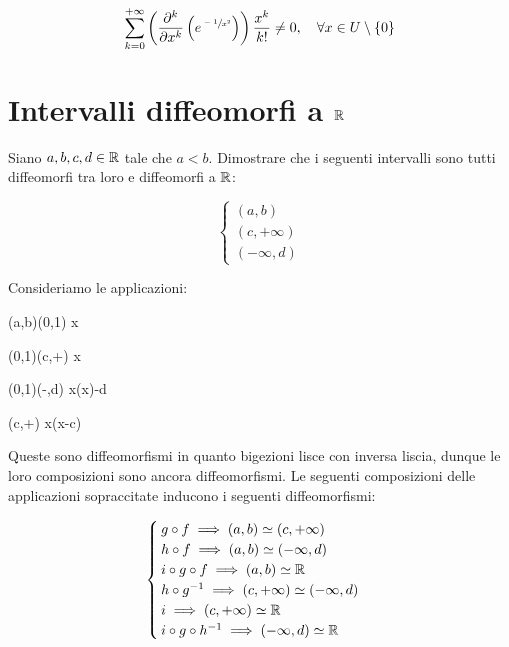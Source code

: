 \begin{equation}
	\sum_{k=0}^{+\infty} \left( \pdv[k]{x} \left( e^{\sfrac{-1}{x^{2}}} \right) \right) \dfrac{x^{k}}{k!} \neq 0 \qcomma \forall x \in U \setminus \{0\}
\end{equation}

%

\newpage

%

\section{Intervalli diffeomorfi a $ \mathbb{R} $}\label{es1-3}

\begin{tcolorbox}
	Siano $ a,b,c,d \in \mathbb{R} $ tale che $ a<b $. Dimostrare che i seguenti intervalli sono tutti diffeomorfi tra loro e diffeomorfi a $ \mathbb{R} $:
	
	\begin{equation}
		\begin{cases}
			(a,b)\\
			(c,+\infty)\\
			(-\infty,d)
		\end{cases}
	\end{equation}
\end{tcolorbox}

Consideriamo le applicazioni:

	{(a,b)}{(0,1)}
	{x}{}

	{(0,1)}{(c,+\infty)}
	{x}{}

	{(0,1)}{(-\infty,d)}
	{x}{\ln(x)-d}

	{(c,+\infty)}{\R}
	{x}{\ln(x-c)}

Queste sono diffeomorfismi in quanto bigezioni lisce con inversa liscia, dunque le loro composizioni sono ancora diffeomorfismi. Le seguenti composizioni delle applicazioni sopraccitate inducono i seguenti diffeomorfismi:

\begin{equation}
	\begin{cases}
		g \circ f \implies (a,b) \simeq (c,+\infty)\\
		h \circ f \implies (a,b) \simeq (-\infty,d)\\
		i \circ g \circ f \implies (a,b) \simeq \mathbb{R}\\
		h \circ g^{-1} \implies (c,+\infty) \simeq (-\infty,d)\\
		i \implies (c,+\infty) \simeq \mathbb{R}\\
		i \circ g \circ h^{-1} \implies (-\infty,d) \simeq \mathbb{R}
	\end{cases}
\end{equation}

